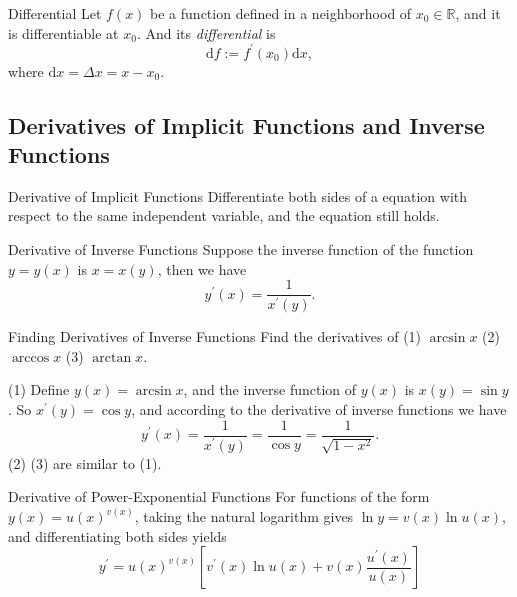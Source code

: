 \begin{definition}{Differential}{}
  Let $f(x)$ be a function defined in a neighborhood of $x_0 \in \mathbb{R}$,
  and it is differentiable at $x_0$.
  And its \emph{differential} is
  \begin{equation}
    \mathrm{d} f := f^{\prime}(x_0) \mathrm{d} x,
  \end{equation}
  where $\mathrm{d} x = \Delta x = x - x_0$.
\end{definition}

\subsection{Derivatives of Implicit Functions and Inverse Functions}

\begin{proposition}{Derivative of Implicit Functions}{}
  Differentiate both sides of a equation with respect to the same independent variable,
  and the equation still holds.
\end{proposition}

\begin{proposition}{Derivative of Inverse Functions}{}
  Suppose the inverse function of the function $y = y(x)$ is $x = x(y)$,
  then we have
  \begin{equation}
    y^{\prime}(x) = \frac{1}{x^{\prime}(y)}.
  \end{equation}
\end{proposition}

\begin{example}{Finding Derivatives of Inverse Functions}{}
  Find the derivatives of
  (1) $\arcsin x$ (2) $\arccos x$ (3) $\arctan x$.
\end{example}

\begin{solution}
  (1) Define $y(x) = \arcsin x$, and the inverse function of $y(x)$ is
  $x(y) = \sin y$. So $x^{\prime}(y) = \cos y$, and according to the derivative
  of inverse functions we have
  \begin{equation}
    y^{\prime}(x) = \frac{1}{x^{\prime}(y)} = \frac{1}{\cos y} = \frac{1}{\sqrt{1 - x^2}}.
  \end{equation}
  (2) (3) are similar to (1).
\end{solution}

\begin{proposition}{Derivative of Power-Exponential Functions}{}
  For functions of the form $y(x) = u(x)^{v(x)}$,
  taking the natural logarithm gives $\ln y = v(x) \ln u(x)$,
  and differentiating both sides yields
  \begin{equation}
    y^{\prime}=u(x)^{v(x)}\left[v^{\prime}(x)\ln u(x)+v(x)\frac{u^{\prime}(x)}{u(x)}\right]
  \end{equation}
\end{proposition}

